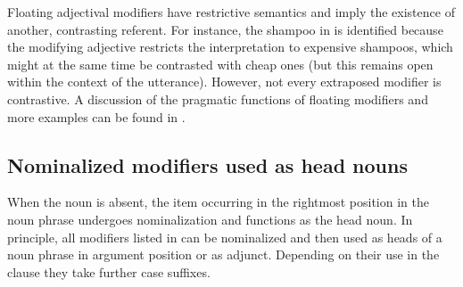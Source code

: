 Floating adjectival modifiers have restrictive semantics and imply the existence of another, contrasting referent. For instance, the shampoo in  is identified because the modifying adjective restricts the interpretation to expensive shampoos, which might at the same time be contrasted with cheap ones (but this remains open within the context of the utterance). However, not every extraposed modifier is contrastive. A discussion of the pragmatic functions of floating modifiers and more examples can be found in .



\subsection{Nominalized modifiers used as head nouns}
\label{ssec:Headless noun phrases and nominalizations}

When the noun is absent, the item occurring in the rightmost position in the noun phrase undergoes nominalization and functions as the head noun. In principle, all modifiers listed in  can be nominalized and then used as heads of a noun phrase in argument position or as adjunct. Depending on their use in the clause they take further case suffixes. 
 
